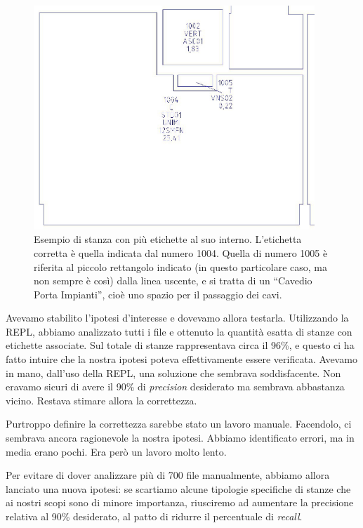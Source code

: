 \documentclass[12pt]{report}
\begin{document}
\begin{figure}[H]
    \centering
    \includegraphics[width=300pt,natwidth=945,natheight=753]{03-dxf-stanza-etichette-fuori.jpg}
    \caption{Esempio di stanza con più etichette al suo interno. L'etichetta 
    corretta è quella indicata dal numero 1004. Quella di numero 1005 è
    riferita al piccolo rettangolo indicato (in questo particolare caso,
    ma non sempre è così) dalla linea uscente, e si tratta di
	un ``Cavedio Porta Impianti'', cioè uno spazio per il passaggio dei cavi.
	}
    \label{fig:dxf_room_labels}
\end{figure}

Avevamo stabilito l'ipotesi d'interesse e dovevamo allora testarla.
Utilizzando la REPL, abbiamo analizzato tutti i file e ottenuto
la quantità esatta di stanze con etichette associate. Sul totale di
stanze rappresentava circa il 96\%, e questo ci ha fatto intuire che
la nostra ipotesi poteva effettivamente essere verificata.
Avevamo in mano, dall'uso della REPL, una soluzione che sembrava 
soddisfacente. Non eravamo sicuri di avere il 90\% di \textit{precision}
desiderato ma sembrava abbastanza vicino. Restava stimare allora
la correttezza.

Purtroppo definire la correttezza sarebbe stato un lavoro manuale. Facendolo,
ci sembrava ancora ragionevole la nostra ipotesi. Abbiamo identificato errori,
ma in media erano pochi. Era però un lavoro molto lento.

Per evitare di dover analizzare più di 700 file manualmente,
abbiamo allora lanciato una nuova ipotesi: se scartiamo alcune
tipologie specifiche di stanze che ai nostri scopi sono di minore
importanza, riusciremo ad aumentare la precisione relativa al 90\%
desiderato, al patto di ridurre il percentuale di \textit{recall}.
\end{document}
